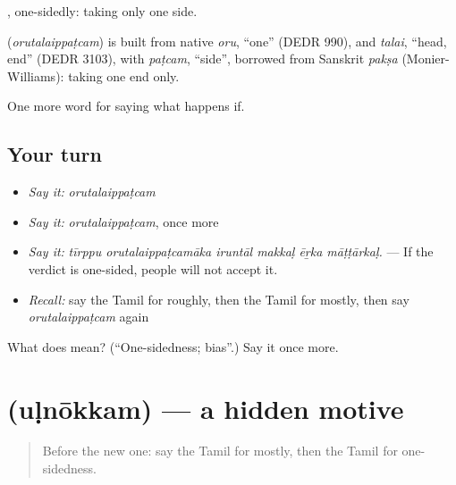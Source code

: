 , one-sidedly: taking only one side.

\begin{cousinweb}
\textbf{} (\emph{orutalaippaṭcam}) is built from native \emph{oru}, \textquotedblleft{}one\textquotedblright{} (DEDR 990), and \emph{talai}, \textquotedblleft{}head, end\textquotedblright{} (DEDR 3103), with \emph{paṭcam}, \textquotedblleft{}side\textquotedblright{}, borrowed from Sanskrit \emph{pakṣa} (Monier-Williams): taking one end only.
\end{cousinweb}

\begin{grammarlens}[title={What you've built}]
One more word for saying what happens if.
\end{grammarlens}

\subsection*{Your turn}
\begin{itemize}
\raggedright
  \item \emph{Say it:} \emph{orutalaippaṭcam}
  \item \emph{Say it:} \emph{orutalaippaṭcam}, once more
  \item \emph{Say it:} \emph{tīrppu orutalaippaṭcamāka iruntāl makkaḷ ēṟka māṭṭārkaḷ.} — If the verdict is one-sided, people will not accept it.
  \item \emph{Recall:} say the Tamil for roughly, then the Tamil for mostly, then say \emph{orutalaippaṭcam} again
\end{itemize}

\begin{tcolorbox}[breakable,colback=teal!4,colframe=teal!35!black,title={Before you move on}]
What does  mean? (\textquotedblleft{}One-sidedness; bias\textquotedblright{}.) Say it once more.
\end{tcolorbox}
\section[\texorpdfstring{\ta{உள்நோக்கம்} (uḷnōkkam)}{உள்நோக்கம் (uḷnōkkam)}]{ (uḷnōkkam) — a hidden motive}

\label{lesson:TA-C394-ulnokkam}



\begin{quote}
Before the new one: say the Tamil for mostly, then the Tamil for one-sidedness.
\end{quote}

